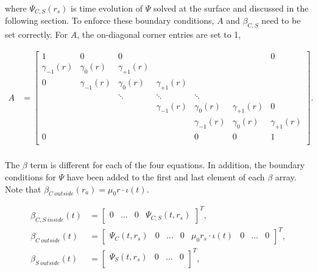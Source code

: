 \documentclass{article}
\begin{document}
\noindent where $\Psi_{C,S}(r_s)$ is time evolution of $\Psi$ solved at the surface and discussed in the following section.  To enforce these boundary conditions, $A$ and $\beta_{C,S}$ need to be set correctly.  For $A$, the on-diagonal corner entries are set to 1, 

\begin{equation} \label{eq:BVPAMatrix}
\begin{split}
A &= 
\begin{bmatrix}
1& 0 & 0 & & & & 0\\
 \gamma_{-1}(r)  & \gamma_{0}(r)      & \gamma_{+1}(r) &  &   &  \\
0 & \gamma_{-1}(r)       & \gamma_{0}(r)      & \gamma_{+1}(r)  &  &  \\
& & \ddots      & \ddots  & \ddots  & \\
& &    &\gamma_{-1}(r)       & \gamma_{0}(r)      & \gamma_{+1}(r) & 0 \\
&        &  &  & \gamma_{-1}(r)       & \gamma_{0}(r) & \gamma_{+1}(r) \\
0 &        &  &  & 0 &  0  & 1 \\
\end{bmatrix}. \\
\end{split}
\end{equation}

\noindent The $\beta$ term is different for each of the four equations.  In addition, the boundary conditions for $\Psi$ have been added to the first and last element of each $\beta$ array. Note that $\beta_{C \ outside}(r_a)=\mu_0r \cdot \iota(t)$.

\begin{equation} \label{eq:BVPAMatrix}
\begin{split}
\beta_{C,S \ inside}(t) &= 
\begin{bmatrix}
0& \ldots &  0 & \Psi_{C,S}(t,r_s)
\end{bmatrix}^T, \\
\beta_{C \ outside}(t) &= 
\begin{bmatrix}
\Psi_{C}(t,r_s) & 0 & \ldots &0 &\mu_0r_s \cdot \iota(t)  &0&\ldots &  0 
\end{bmatrix}^T, \\
\beta_{S \ outside}(t) &= 
\begin{bmatrix}
\Psi_{S}(t,r_s) & 0 & \ldots &  0 \\
\end{bmatrix}^T, \\
\end{split}
\end{equation}
\end{document}
